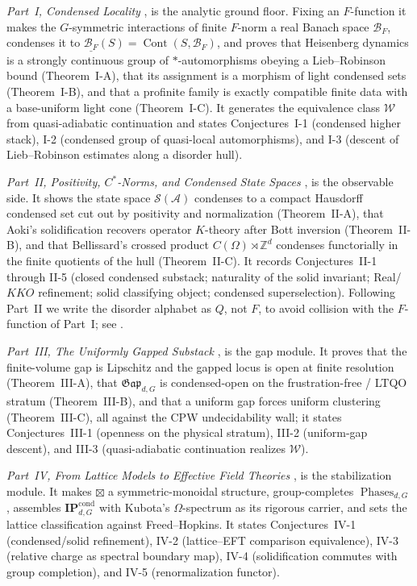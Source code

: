 \documentclass[12pt]{article}
\newcommand{\cond}[1]{\underline{#1}}          %
\newcommand{\Cont}{\operatorname{Cont}}        %
\newcommand{\Ffun}{F}                          %
\newcommand{\BF}{\mathcal{B}_{F}}              %
\newcommand{\Gap}{\mathfrak{Gap}}              %
\newcommand{\Phases}{\operatorname{Phases}}    %
\newcommand{\Weq}{\mathcal{W}}                 %
\newcommand{\IPcond}{\mathbf{IP}^{\mathrm{cond}}}  %
\newcommand{\dis}{\Omega}                       %
\newcommand{\ZZ}{\mathbb{Z}}
\newcommand{\qA}{\mathcal{A}}                  %
\newcommand{\St}{\mathcal{S}}                  %
\theoremstyle{plain}
\theoremstyle{definition}
\theoremstyle{remark}
\begin{document}
\emph{Part~I, Condensed Locality} \cite{paperLocality}, is the analytic ground floor.
Fixing an $\Ffun$-function it makes the $G$-symmetric interactions of finite
$\Ffun$-norm a real Banach space $\BF$, condenses it to $\cond{\BF}(S)=\Cont(S,\BF)$,
and proves that Heisenberg dynamics is a strongly continuous group of $\ast$-automorphisms
obeying a Lieb--Robinson bound (Theorem~I-A), that its assignment is a morphism of light
condensed sets (Theorem~I-B), and that a profinite family is exactly compatible finite
data with a base-uniform light cone (Theorem~I-C)\@. It generates the equivalence class
$\Weq$ from quasi-adiabatic continuation and states Conjectures~I-1 (condensed higher
stack), I-2 (condensed group of quasi-local automorphisms), and I-3 (descent of
Lieb--Robinson estimates along a disorder hull).

\emph{Part~II, Positivity, $C^\ast$-Norms, and Condensed State Spaces}
\cite{paperPositivity}, is the observable side. It shows the state space
$\St(\qA)$ condenses to a compact Hausdorff condensed set cut out by positivity and
normalization (Theorem~II-A), that Aoki's solidification recovers operator $K$-theory
after Bott inversion (Theorem~II-B), and that Bellissard's crossed product
$C(\dis)\rtimes\ZZ^d$ condenses functorially in the finite quotients of the hull
(Theorem~II-C)\@. It records Conjectures~II-1 through II-5 (closed condensed substack;
naturality of the solid invariant; Real/$KKO$ refinement; solid classifying object;
condensed superselection). Following Part~II we write the disorder alphabet as $Q$, not
$\Ffun$, to avoid collision with the $\Ffun$-function of Part~I; see
.

\emph{Part~III, The Uniformly Gapped Substack} \cite{paperGap}, is the gap module. It
proves that the finite-volume gap is Lipschitz and the gapped locus is open at finite
resolution (Theorem~III-A), that $\Gap_{d,G}$ is condensed-open on the frustration-free
/ LTQO stratum (Theorem~III-B), and that a uniform gap forces uniform clustering
(Theorem~III-C), all against the CPW undecidability wall; it states Conjectures~III-1
(openness on the physical
stratum), III-2 (uniform-gap descent), and III-3 (quasi-adiabatic continuation realizes
$\Weq$).

\emph{Part~IV, From Lattice Models to Effective Field Theories} \cite{paperEFT}, is the
stabilization module. It makes $\boxtimes$ a symmetric-monoidal structure, group-completes
$\Phases_{d,G}$, assembles $\IPcond_{d,G}$ with Kubota's $\Omega$-spectrum as its
rigorous carrier, and sets the lattice classification against Freed--Hopkins. It states
Conjectures~IV-1 (condensed/solid refinement), IV-2 (lattice--EFT comparison
equivalence), IV-3 (relative charge as spectral boundary map), IV-4 (solidification
commutes with group completion), and IV-5 (renormalization functor).
\end{document}
